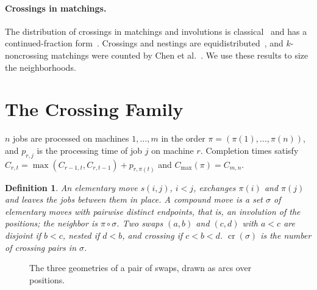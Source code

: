 \documentclass{article}
\newtheorem{definition}{Definition}
\newcommand{\ncr}{\operatorname{cr}}
\begin{document}
\paragraph{Crossings in matchings.} The distribution of crossings in
matchings and involutions is classical~\cite{touchard1952,riordan1975}
and has a continued-fraction form~\cite{flajolet1980}. Crossings and
nestings are equidistributed~\cite{kasraoui2006}, and $k$-noncrossing
matchings were counted by Chen et al.~\cite{chen2007}. We use these
results to size the neighborhoods.

\section{The Crossing Family}\label{sec:family}

$n$ jobs are processed on machines $1,\dots,m$ in the order
$\pi=(\pi(1),\dots,\pi(n))$, and $p_{r,j}$ is the processing time of job
$j$ on machine $r$. Completion times satisfy
$C_{r,t}=\max(C_{r-1,t},C_{r,t-1})+p_{r,\pi(t)}$ and
$C_{\max}(\pi)=C_{m,n}$.

\begin{definition}
An \emph{elementary move} $s(i,j)$, $i<j$, exchanges $\pi(i)$ and
$\pi(j)$ and leaves the jobs between them in place. A \emph{compound
move} is a set $\sigma$ of elementary moves with pairwise distinct
endpoints, that is, an involution of the positions; the neighbor is
$\pi\circ\sigma$. Two swaps $(a,b)$ and $(c,d)$ with $a<c$ are
\emph{disjoint} if $b<c$, \emph{nested} if $d<b$, and \emph{crossing} if
$c<b<d$. $\ncr(\sigma)$ is the number of crossing pairs in $\sigma$.
\end{definition}

\begin{figure}[t]
\centering
{}
\caption{The three geometries of a pair of swaps, drawn as arcs over
positions.}
\label{fig:geometry}
\end{figure}
\end{document}

